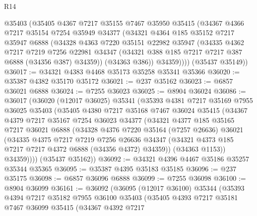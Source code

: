 \begin{lexlean}{R14}
\begin{coremodule}
        @35403
        (@35405
          @4367
          @7217
          @35155
          @7467
          @35950
          @35415
          (@34367
            @4366
            @7217
            @35154
            @7254
            @35949
            @34377
            (@34321
              @4364
              @185
              @35152
              @7217
              @35947
              @6888
              (@34328
                @4363
                @7220
                @35151
                @22982
                @35947
                (@34335
                  @4362
                  @7217
                  @7219
                  @7256
                  @22981
                  @34347
                  (@34321 @388 @185 @7217 @7217 @387 @6888 (@34356 @387) @34359))
                (@34363 @386))
              @34359))))
      (@35437 @35149))
@36017 := @34321 @4383 @4468 @35173 @35258 @35341 @35366
@36020 := @35387 @4382 @35170 @35172
@36021 := @237 @35162
@36023 := @6857 @36021 @6888
@36024 := @7255 @36023
@36025 := @8904 @36024
@36086 := @36017
    (@36020
      (@12017 @36025)
      @35341
      (@35393
        @4381
        @7217
        @35169
        @7955
        @36025
        @35403
        (@35405
          @4380
          @7217
          @35168
          @7467
          @36024
          @35415
          (@34367
            @4379
            @7217
            @35167
            @7254
            @36023
            @34377
            (@34321
              @4377
              @185
              @35165
              @7217
              @36021
              @6888
              (@34328
                @4376
                @7220
                @35164
                (@7257 @26636)
                @36021
                (@34335
                  @4375
                  @7217
                  @7219
                  @7256
                  @26636
                  @34347
                  (@34321 @4373 @185 @7217 @7217 @4372 @6888 (@34356 @4372) @34359))
                (@34363 @1153))
              @34359))))
      (@35437 @35162))
@36092 := @34321 @4396 @4467 @35186 @35257 @35344 @35365
@36095 := @35387 @4395 @35183 @35185
@36096 := @237 @35175
@36098 := @6857 @36096 @6888
@36099 := @7255 @36098
@36100 := @8904 @36099
@36161 := @36092
    (@36095
      (@12017 @36100)
      @35344
      (@35393
        @4394
        @7217
        @35182
        @7955
        @36100
        @35403
        (@35405
          @4393
          @7217
          @35181
          @7467
          @36099
          @35415
          (@34367
            @4392
            @7217

\end{coremodule}
\end{lexlean}
